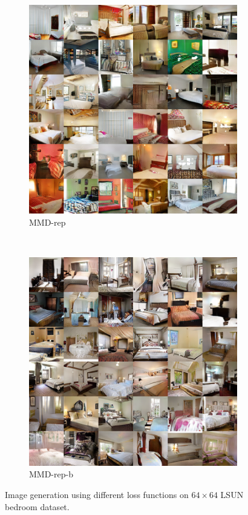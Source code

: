 \documentclass{article} %
\theoremstyle{plain}
\newtheorem*{proposition 1*}{Proposition 1}
\begin{document}
\begin{appendices}
\begin{figure}[tb]
	\begin{subfigure}[t]{0.45\linewidth}
		\centering
		\includegraphics[width=1\textwidth]{lsun_rep.png}
		\caption{MMD-rep\label{fig:sample_lsun_rep}}
	\end{subfigure}
	~
	\begin{subfigure}[t]{0.45\linewidth}
		\centering
		\includegraphics[width=1\textwidth]{lsun_rmb.png}
		\caption{MMD-rep-b\label{fig:sample_lsun_rmb}}
	\end{subfigure}
	\caption{Image generation using different loss functions on \(64\times64\) LSUN bedroom dataset.}  
	\label{fig:samples_lsun}
\end{figure}

\end{appendices}
\end{document}

